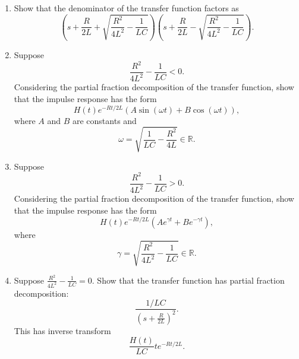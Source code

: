 \documentclass{article}
\begin{document}
\begin{enumerate}
	\item Show that the denominator of the transfer function factors as
		\[\left(s+\frac{R}{2L}+\sqrt{\frac{R^2}{4L^2}-\frac{1}{LC}}\right)\left(s+\frac{R}{2L}-\sqrt{\frac{R^2}{4L^2}-\frac{1}{LC}}\right).\]
	\item Suppose
		\[\frac{R^2}{4L^2}-\frac{1}{LC}< 0.\]
		Considering the partial fraction decomposition of the transfer function, show that the impulse response has the form
		\[H(t)e^{-Rt/2L}\left(A\sin(\omega t)+B\cos(\omega t)\right),\]
		where $A$ and $B$ are constants and
		\[\omega=\sqrt{\frac{1}{LC}-\frac{R^2}{4L}}\in\mathbb{R}.\]
	\item Suppose
		\[\frac{R^2}{4L^2}-\frac{1}{LC}> 0.\]
		Considering the partial fraction decomposition of the transfer function, show that the impulse response has the form
		\[H(t)e^{-Rt/2L}\left(Ae^{\gamma t}+Be^{-\gamma t}\right),\]
		where
		\[\gamma=\sqrt{\frac{R^2}{4L^2}-\frac{1}{LC}}\in\mathbb{R}.\]
	\item Suppose $\frac{R^2}{4L^2}-\frac{1}{LC}=0$.
		Show that the transfer function has partial fraction decomposition:
		\[\frac{1/LC}{\left(s+\frac{R}{2L}\right)^2}.\]
		This has inverse transform
		\[\frac{H(t)}{LC}te^{-Rt/2L}.\]
\end{enumerate}
\end{document}
